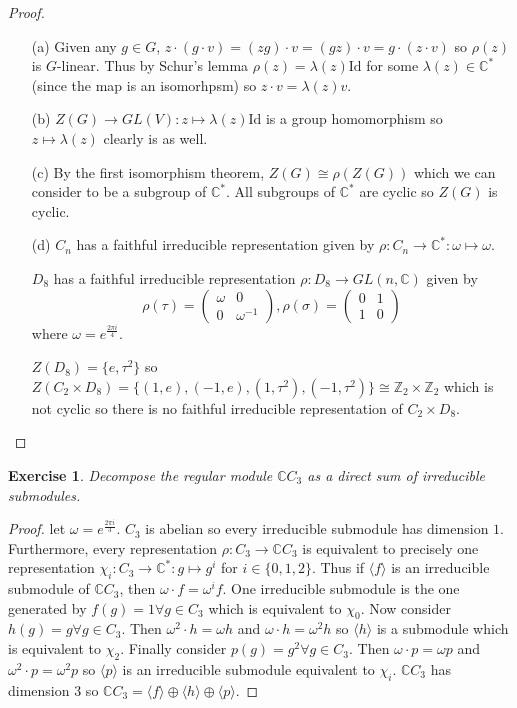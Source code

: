 \documentclass{article}
\newtheorem{exercise}[theorem]{Exercise}
\begin{document}
\begin{proof}
\begin{enumerate}
    \item[(a)] Given any $g\in G$, $z\cdot(g\cdot v)=(zg)\cdot v=(gz)\cdot v=g\cdot(z\cdot v)$ so $\rho(z)$ is $G$-linear. Thus by Schur's lemma $\rho(z)=\lambda(z)\text{Id}$ for some $\lambda(z)\in\mathbb{C}^*$ (since the map is an isomorhpsm) so $z\cdot v=\lambda(z)v$.
    \item[(b)] $Z(G)\to GL(V):z\mapsto\lambda(z)\text{Id}$ is a group homomorphism so $z\mapsto\lambda(z)$ clearly is as well.
    \item[(c)] By the first isomorphism theorem, $Z(G)\cong\rho(Z(G))$ which we can consider to be a subgroup of $\mathbb{C}^*$. All subgroups of $\mathbb{C}^*$ are cyclic so $Z(G)$ is cyclic.
    \item[(d)] $C_n$ has a faithful irreducible representation given by $\rho:C_n\to \mathbb{C}^*:\omega\mapsto\omega$. 

    $D_8$ has a faithful irreducible representation $\rho:D_8\to GL(n,\mathbb{C})$ given by\[\rho(\tau)=\begin{pmatrix}
\omega & 0 \\
0 & \omega^{-1}
\end{pmatrix},\rho(\sigma)=\begin{pmatrix}
0 & 1 \\
1 & 0
\end{pmatrix}\] where $\omega=e^\frac{2\pi i}{4}$.

$Z(D_8)=\{e,\tau^2\}$ so $Z(C_2\times D_8)=\{(1,e),(-1,e),(1,\tau^2),(-1,\tau^2)\}\cong \mathbb{Z}_2\times\mathbb{Z}_2$ which is not cyclic so there is no faithful irreducible representation of $C_2\times D_8$.
\end{enumerate}
\end{proof}

\begin{exercise}
     Decompose the regular module \( \mathbb{C}C_3 \) as a direct sum of irreducible submodules.
\end{exercise}
\begin{proof}
let $\omega=e^{\frac{2\pi i}{3}}$. $C_3$ is abelian so every irreducible submodule has dimension $1$. Furthermore, every representation $\rho:C_3\to\mathbb{C}C_3$ is equivalent to precisely one representation $\chi_i:C_3\to\mathbb{C}^*:g\mapsto g^i$ for $i\in\{0,1,2\}$. Thus if $\langle f\rangle$ is an irreducible submodule of $\mathbb{C}C_3$, then $\omega\cdot f=\omega^i f$. One irreducible submodule is the one generated by $f(g)=1\forall g\in C_3$ which is equivalent to $\chi_0$. Now consider $h(g)=g\forall g\in C_3$. Then $\omega^2\cdot h=\omega h$ and $\omega\cdot h=\omega^2 h$ so $\langle h\rangle$ is a submodule which is equivalent to $\chi_2$. Finally consider $p(g)=g^2\forall g\in C_3$. Then $\omega\cdot p=\omega p$ and $\omega^2\cdot p=\omega^2 p$ so $\langle p\rangle$ is an irreducible submodule equivalent to $\chi_i$. $\mathbb{C}C_3$ has dimension $3$ so $\mathbb{C}C_3=\langle f\rangle\oplus\langle h\rangle\oplus\langle p\rangle$.
\end{proof}
\end{document}
